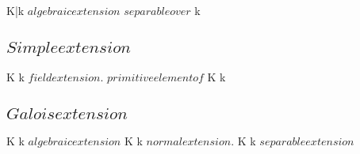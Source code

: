 \documentclass[a5paper]{book}
\begin{document}
{	
	{
		K|k $ algebraic extension $
	}
	{
	}
	{
		{
			\theta $ separable over $ k
		}
	}
	

	\subsection{ $ Simple extension $ }
	
	{
		K \extends k $ field extension $.
	}
	{
	}
	\denote
	{
		\theta \as $ primitive element of $ K \extends k 
	}


	\subsection{ $ Galois extension $ }
	
	{
		K \extends k $ algebraic extension $
	}
	{
		K \extends k $ normal extension $.
		K \extends k $ separable extension $
	}

}
\end{document}
